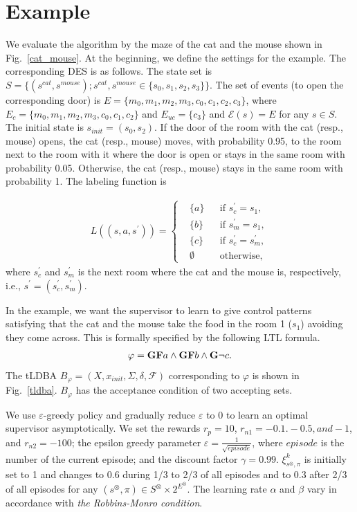 \documentclass[letterpaper, 10 pt, conference, dvipdfmx]{ieeeconf}
\begin{document}
\section{Example}
We evaluate the algorithm by the maze of the cat and the mouse shown in Fig.\ \ref{cat_mouse}. At the beginning, we define the settings for the example. The corresponding DES is as follows. The state set is $S = \{ (s^{cat}, s^{mouse}) ; s^{cat},s^{mouse} \in \{ s_0,s_1,s_2,s_3 \} \}$. The set of events (to open the corresponding door) is $E = \{ m_0, m_1, m_2, m_3, c_0, c_1, c_2, c_3 \}$, where $E_{c} = \{ m_0, m_1, m_2, m_3, c_0, c_1, c_2 \}$ and $E_{uc} = \{ c_3 \}$ and $\mathcal{E}(s) = E$ for any $s \in S$. The initial state is $s_{init} = (s_0, s_2)$. If the door of the room with the cat (resp., mouse) opens, the cat (resp., mouse) moves, with probability 0.95, to the room next to the room with it where the door is open or stays in the same room with probability 0.05. Otherwise, the cat (resp., mouse) stays in the same room with probability 1. The labeling function is

\begin{align}
   L((s, a, s^{\prime})) =
    \left\{
    \begin{aligned}
      & \{ a \} &  & \text{if }s_c^{\prime} = s_1, \nonumber \\
      & \{ b \} &  & \text{if }s_m^{\prime} = s_1, \nonumber \\
      & \{ c \} &  & \text{if }s_c^{\prime} = s_m^{\prime}, \nonumber \\
      & \emptyset &  & \text{otherwise},
    \end{aligned}
    \right.
\end{align}
where $s_c^{\prime}$ and $s_m^{\prime}$ is the next room where the cat and the mouse is, respectively, i.e., $s^{\prime} = (s_c^{\prime},s_m^{\prime})$.

In the example, we want the supervisor to learn to give control patterns satisfying that the cat and the mouse take the food in the room 1 ($s_1$) avoiding they come across. This is formally specified by the following LTL formula.
\begin{align*}
  \varphi = \text{{\bf GF}}a \wedge \text{{\bf GF}}b \wedge \text{{\bf G}}\neg c.
\end{align*}
The tLDBA $B_{\varphi} = (X, x_{init},\Sigma,\delta,\mathcal{F})$ corresponding to $\varphi$ is shown in Fig.\ \ref{tldba}. $B_{\varphi}$ has the acceptance condition of two accepting sets.

We use $\varepsilon$-greedy policy and gradually reduce $\varepsilon$ to 0 to learn an optimal supervisor asymptotically.
We set the rewards $r_p = 10$, $r_{n1} = -0.1. -0.5, and -1$, and $r_{n2} = -100$; the epsilon greedy parameter $ \varepsilon = \frac{1}{ \sqrt{episode} }$, where $episode$ is the number of the current episode; and the discount factor $\gamma = 0.99$. $\xi^k_{s^{\otimes},\pi}$ is initially set to 1 and changes to 0.6 during 1/3 to 2/3 of all episodes and to 0.3 after 2/3 of all episodes for any $(s^{\otimes},\pi) \in S^{\otimes} \times 2^{E^{\otimes}}$. The learning rate $\alpha$ and $\beta$ vary in accordance with {\it the Robbins-Monro condition}.
\end{document}

